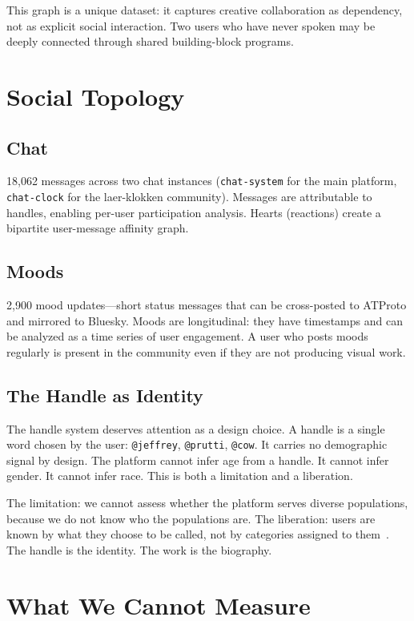\documentclass[10pt,letterpaper,twocolumn]{article}
\begin{document}
This graph is a unique dataset: it captures creative collaboration as dependency, not as explicit social interaction. Two users who have never spoken may be deeply connected through shared building-block programs.

\section{Social Topology}

\subsection{Chat}

18,062 messages across two chat instances (\texttt{chat-system} for the main platform, \texttt{chat-clock} for the laer-klokken community). Messages are attributable to handles, enabling per-user participation analysis. Hearts (reactions) create a bipartite user-message affinity graph.

\subsection{Moods}

2,900 mood updates---short status messages that can be cross-posted to ATProto and mirrored to Bluesky. Moods are longitudinal: they have timestamps and can be analyzed as a time series of user engagement. A user who posts moods regularly is present in the community even if they are not producing visual work.

\subsection{The Handle as Identity}

The handle system deserves attention as a design choice. A handle is a single word chosen by the user: \texttt{@jeffrey}, \texttt{@prutti}, \texttt{@cow}. It carries no demographic signal by design. The platform cannot infer age from a handle. It cannot infer gender. It cannot infer race. This is both a limitation and a liberation.

The limitation: we cannot assess whether the platform serves diverse populations, because we do not know who the populations are. The liberation: users are known by what they choose to be called, not by categories assigned to them~\citep{costanzachock2020design}. The handle is the identity. The work is the biography.

\section{What We Cannot Measure}
\end{document}
